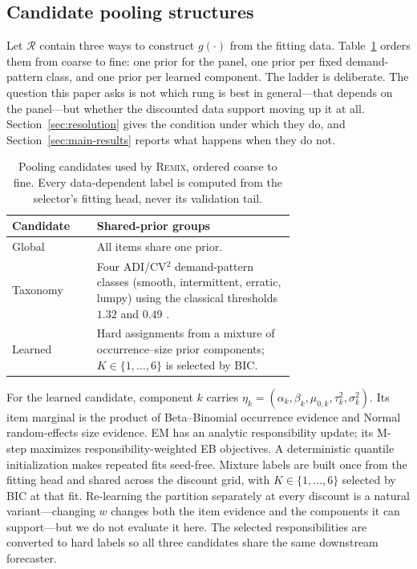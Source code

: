 \documentclass[twocolumn,10pt]{article}
\theoremstyle{definition}
\newcommand{\REMIX}{\textsc{Remix}}
\begin{document}
\subsection{Candidate pooling structures}\label{sec:mixture}

Let $\mathcal R$ contain three ways to construct $g(\cdot)$ from the
fitting data. Table~\ref{tab:pool-candidates} orders them from coarse to
fine: one prior for the panel, one prior per fixed demand-pattern class,
and one prior per learned component. The ladder is deliberate. The
question this paper asks is not which rung is best in general---that
depends on the panel---but whether the discounted data support moving up
it at all. Section~\ref{sec:resolution} gives the condition under which
they do, and Section~\ref{sec:main-results} reports what happens when they
do not.

\begin{table}[t]
\centering
\caption{Pooling candidates used by \REMIX{}, ordered coarse to fine.
Every data-dependent label is computed from the selector's fitting head,
never its validation tail.}
\label{tab:pool-candidates}
\small
\setlength{\tabcolsep}{3.5pt}
\begin{tabular}{lp{0.70\linewidth}}
\toprule
Candidate & Shared-prior groups\\
\midrule
Global & All items share one prior.\\
Taxonomy & Four ADI/CV$^2$ demand-pattern classes (smooth, intermittent,
erratic, lumpy) using the classical thresholds $1.32$ and $0.49$
\citep{syntetos2005categorization}.\\
Learned & Hard assignments from a mixture of occurrence--size prior
components; $K\in\{1,\ldots,6\}$ is selected by BIC.\\
\bottomrule
\end{tabular}
\end{table}

For the learned candidate, component $k$ carries
$\eta_k=(\alpha_k,\beta_k,\mu_{0,k},\tau_k^2,\sigma_k^2)$. Its item
marginal is the product of Beta--Binomial occurrence evidence and Normal
random-effects size evidence. EM has an analytic responsibility update;
its M-step maximizes responsibility-weighted EB objectives. A
deterministic quantile initialization makes repeated fits seed-free.
Mixture labels are built once from the fitting head and shared across the
discount grid, with $K\in\{1,\dots,6\}$ selected by BIC at that fit.
Re-learning the partition separately at every discount is a natural
variant---changing $w$ changes both the item evidence and the components
it can support---but we do not evaluate it here. The
selected responsibilities are converted to hard labels so all three
candidates share the same downstream forecaster.
\end{document}
